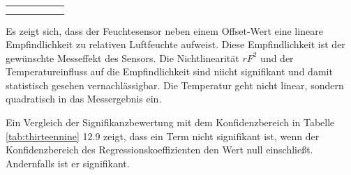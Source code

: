 \begin{table}[H]
{\begin{tabular}{| c | c | c | c | c | c |}
\parbox[c][0.3in][c]{0.95in}{} &
\parbox[c][0.3in][c]{0.95in}{} &
\parbox[c][0.3in][c]{0.95in}{} &
\parbox[c][0.3in][c]{0.95in}{} &
\parbox[c][0.3in][c]{0.95in}{} &
\parbox[c][0.3in][c]{0.95in}{}\\ \hline

\parbox[c][0.3in][c]{0.95in}{} &
\parbox[c][0.3in][c]{0.95in}{} &
\parbox[c][0.3in][c]{0.95in}{} &
\parbox[c][0.3in][c]{0.95in}{} &
\parbox[c][0.3in][c]{0.95in}{} &
\parbox[c][0.3in][c]{0.95in}{}\\ \hline

\parbox[c][0.3in][c]{0.95in}{} &
\parbox[c][0.3in][c]{0.95in}{} &
\parbox[c][0.3in][c]{0.95in}{} &
\parbox[c][0.3in][c]{0.95in}{} &
\parbox[c][0.3in][c]{0.95in}{} &
\parbox[c][0.3in][c]{0.95in}{}\\ \hline

\end{tabular}%
}
\label{tab:thirteensix}
\end{table}

\noindent Es zeigt sich, dass der Feuchtesensor neben einem Offset-Wert eine lineare Empfindlichkeit zu relativen Luftfeuchte aufweist. Diese Empfindlichkeit ist der gew\"{u}nschte Messeffekt des Sensors. Die Nichtlinearit\"{a}t $rF^{2}$ und der Temperatureinfluss auf die Empfindlichkeit sind niicht signifikant und damit statistisch gesehen vernachl\"{a}ssigbar. Die Temperatur geht nicht linear, sondern quadratisch in das Messergebnis ein.\newline

\noindent Ein Vergleich der Signifikanzbewertung mit dem Konfidenzbereich in Tabelle \ref{tab:thirteennine} 12.9 zeigt, dass ein Term nicht signifikant ist, wenn der Konfidenzbereich des Regressionskoeffizienten den Wert null einschlie{\ss}t. Andernfalls ist er signifikant.

